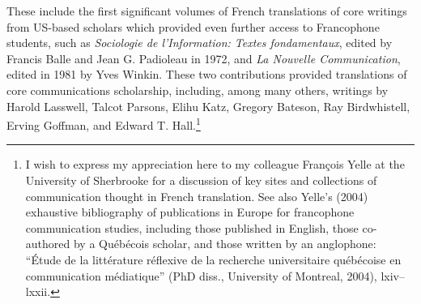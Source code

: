 \documentclass{tufte-handout}
\begin{document}
\noindent These include the first significant volumes of French translations of
core writings from US-based scholars which provided even further access
to Francophone students, such as \emph{Sociologie de l'Information:
Textes fondamentaux}, edited by Francis Balle and Jean G. Padioleau in
1972, and \emph{La Nouvelle Communication}, edited in 1981 by Yves
Winkin. These two contributions provided translations of core
communications scholarship, including, among many others, writings by
Harold Lasswell, Talcot Parsons, Elihu Katz, Gregory Bateson, Ray
Birdwhistell, Erving Goffman, and Edward T. Hall.\footnote{I wish to
  express my appreciation here to my colleague François Yelle at the
  University of Sherbrooke for a discussion of key sites and collections
  of communication thought in French translation. See also Yelle's
  (2004) exhaustive bibliography of publications in Europe for
  francophone communication studies, including those published in
  English, those co-authored by a Québécois scholar, and those written
  by an anglophone: ``Étude de la littérature réflexive de la recherche
  universitaire québécoise en communication médiatique'' (PhD diss.,
  University of Montreal, 2004), lxiv--lxxii.}
\end{document}
